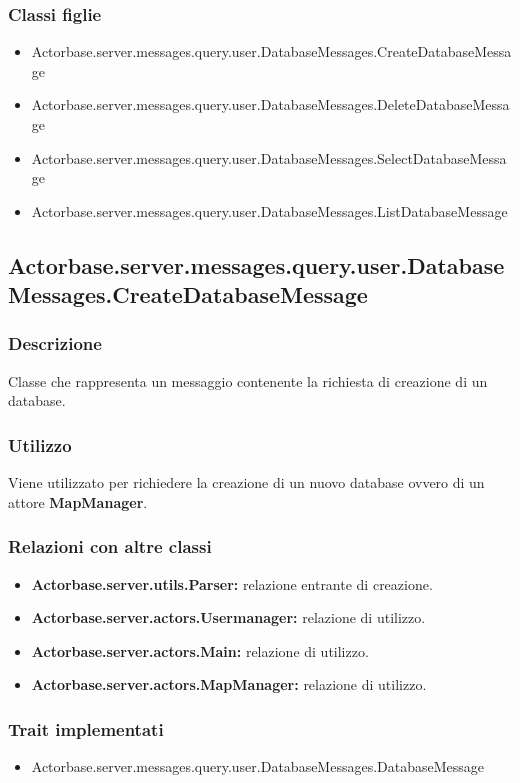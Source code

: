 \documentclass[a4paper]{article}
\begin{document}
			\subsubsection{Classi figlie}
				\begin{itemize}
					\item Actorbase.server.messages.query.user.DatabaseMessages.CreateDatabaseMessage
					\item Actorbase.server.messages.query.user.DatabaseMessages.DeleteDatabaseMessage
					\item Actorbase.server.messages.query.user.DatabaseMessages.SelectDatabaseMessage
					\item Actorbase.server.messages.query.user.DatabaseMessages.ListDatabaseMessage
				\end{itemize}
		
		\subsection{Actorbase.server.messages.query.user.DatabaseMessages.CreateDatabaseMessage}
			\subsubsection{Descrizione}
				Classe che rappresenta un messaggio contenente la richiesta di creazione di un database.
				
			\subsubsection{Utilizzo}
				Viene utilizzato per richiedere la creazione di un nuovo database ovvero di un attore \textbf{MapManager}.
				
			\subsubsection{Relazioni con altre classi}
				\begin{itemize}
					\item \textbf{Actorbase.server.utils.Parser:} relazione entrante di creazione.
					\item \textbf{Actorbase.server.actors.Usermanager:} relazione di utilizzo.
					\item \textbf{Actorbase.server.actors.Main:} relazione di utilizzo.
					\item \textbf{Actorbase.server.actors.MapManager:} relazione di utilizzo.
				\end{itemize}
			\subsubsection{Trait implementati}
				\begin{itemize}
					\item Actorbase.server.messages.query.user.DatabaseMessages.DatabaseMessage
				\end{itemize}
				
\end{document}
